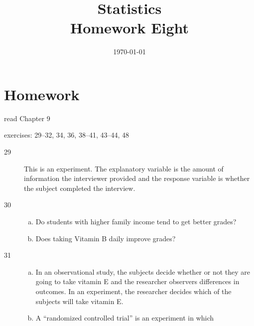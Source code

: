 \documentclass[letterpaper, landscape]{exam}
\title{Statistics \\ Homework Eight}
\date{\today}
\author{}
\begin{document}
  \maketitle

  \ifprintanswers{}
  \else
    \section{Homework}
    \begin{itemize*}
      \item read Chapter 9 
      \item exercises: 29--32, 34, 36, 38--41, 43--44, 48
    \end{itemize*}
  \fi

  \ifprintanswers{}
    \begin{description}

      \item[29] 
        This is an experiment.  The explanatory variable is the amount of
        information the interviewer provided and the response variable is
        whether the subject completed the interview.

      \item[30]
        \begin{enumerate}[(a)]
          \item Do students with higher family income tend to get better grades?

          \item Does taking Vitamin B daily improve grades?
        \end{enumerate}

      \item[31]
        \begin{enumerate}[(a)]
          \item In an observational study, the subjects decide whether or not
            they are going to take vitamin E and the researcher observers
            differences in outcomes.  In an experiment, the researcher decides
            which of the subjects will take vitamin E.

          \item A ``randomized controlled trial'' is an experiment in which 


\end{enumerate}
\end{description}
\end{document}
